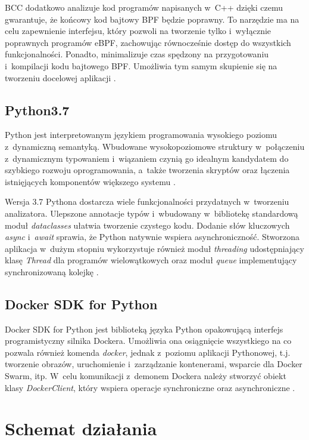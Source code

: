 BCC dodatkowo analizuje kod programów napisanych w~C++ dzięki czemu gwarantuje, że końcowy kod bajtowy BPF będzie poprawny. To narzędzie ma na celu zapewnienie interfejsu, który pozwoli na tworzenie tylko i~wyłącznie poprawnych programów eBPF, zachowując równocześnie dostęp do wszystkich funkcjonalności. Ponadto, minimalizuje czas spędzony na przygotowaniu i~kompilacji kodu bajtowego BPF. Umożliwia tym samym skupienie się na tworzeniu docelowej aplikacji \cite{BCCReadme}.

\subsection{Python3.7}

Python jest interpretowanym językiem programowania wysokiego poziomu z~dynamiczną semantyką. Wbudowane wysokopoziomowe struktury w~połączeniu z~dynamicznym typowaniem i~wiązaniem czynią go idealnym kandydatem do szybkiego rozwoju oprogramowania, a~także tworzenia skryptów oraz łączenia istnięjących komponentów większego systemu \cite{PythonExecutiveSummary}.

Wersja 3.7 Pythona dostarcza wiele funkcjonalności przydatnych w~tworzeniu analizatora. Ulepszone annotacje typów i~wbudowany w~bibliotekę standardową moduł \textit{dataclasses} ułatwia tworzenie czystego kodu. Dodanie słów kluczowych \textit{async} i~\textit{await} sprawia, że Python natywnie wspiera asynchroniczność. Stworzona aplikacja w~dużym stopniu wykorzystuje również moduł \textit{threading} udostępniający klasę \textit{Thread} dla programów wielowątkowych oraz moduł \textit{queue} implementujący synchronizowaną kolejkę \cite{Python3.7}.

\subsection{Docker SDK for Python}

Docker SDK for Python jest biblioteką języka Python opakowującą interfejs programistyczny silnika Dockera. Umożliwia ona osiągnięcie wszystkiego na co pozwala również komenda \textit{docker}, jednak z~poziomu aplikacji Pythonowej, t.j. tworzenie obrazów, uruchomienie i~zarządzanie kontenerami, wsparcie dla Docker Swarm, itp. W~celu komunikacji z~demonem Dockera należy stworzyć obiekt klasy \textit{DockerClient}, który wspiera operacje synchroniczne oraz asynchroniczne \cite{PythonDockerSDK}.

\section{Schemat działania}

